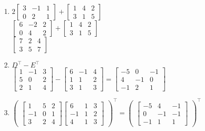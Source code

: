\documentclass[12pt, a4paper, onecolumn, oneside, final, bahasa]{report}
\begin{document}
\begin{enumerate}
\item
  \(2\begin{bmatrix} 3 & -1 & 1 \\ 0 & 2 & 1 \end{bmatrix} +\begin{bmatrix} 1 & 4 & 2 \\ 3 & 1 & 5 \end{bmatrix}\)\\
  \(\begin{bmatrix} 6 & -2 & 2 \\ 0 & 4 & 2 \end{bmatrix} +\begin{bmatrix} 1 & 4 & 2 \\ 3 & 1 & 5 \end{bmatrix}\)\\
  \(\begin{bmatrix} 7 & 2 & 4 \\ 3 & 5 & 7 \end{bmatrix}\)
\item
  \(D^\intercal-E^\intercal\)\\
  \(\begin{bmatrix} 1 & -1 & 3 \\ 5 & 0 & 2 \\ 2 & 1 & 4 \end{bmatrix} -\begin{bmatrix} 6 & -1 & 4 \\ 1 & 1 & 2 \\ 3 & 1 & 3 \end{bmatrix} =\begin{bmatrix} -5 & 0 & -1 \\ 4 & -1 & 0 \\ -1 & 2 & 1 \end{bmatrix}\)
\item
  \(\begin{pmatrix} \begin{bmatrix} 1 & 5 & 2 \\ -1 & 0 & 1 \\ 3 & 2 & 4 \end{bmatrix} \begin{bmatrix} 6 & 1 & 3 \\ -1 & 1 & 2 \\ 4 & 1 & 3 \end{bmatrix} \end{pmatrix}^\intercal =\begin{pmatrix} \begin{bmatrix} -5 & 4 & -1 \\ 0 & -1 & -1 \\ -1 & 1 & 1 \end{bmatrix} \end{pmatrix}^\intercal\)\\

\end{enumerate}
\end{document}
